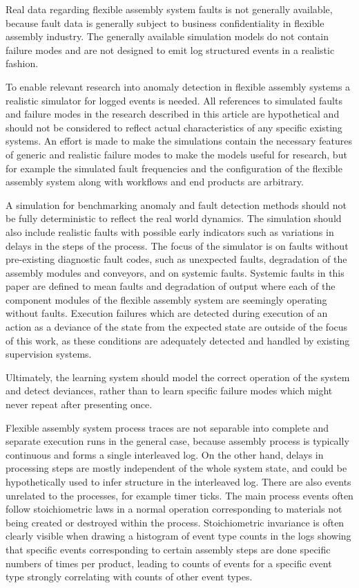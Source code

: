 \documentclass[procedia]{easychair}
\begin{document}
Real data regarding flexible assembly system faults is
not generally available, because fault data is generally subject to business confidentiality in flexible assembly industry.
The generally available simulation models do not contain failure modes and are not designed to emit
log structured events in a realistic fashion.

To enable relevant research into anomaly detection in flexible assembly systems a realistic simulator for logged events is needed.
All references to simulated faults and failure modes in the research described in this article are hypothetical and should not be considered to
reflect actual characteristics of any specific existing systems. An effort is made to make the simulations contain the necessary features of
generic and realistic failure modes to make the models useful for research, but for example the simulated fault frequencies and the configuration
of the flexible assembly system along with workflows and end products are arbitrary.

A simulation for benchmarking anomaly and fault detection methods should not be fully deterministic to reflect the real world dynamics. The simulation should also
include realistic faults with possible early indicators such as variations in delays in the steps of the process. The focus of the simulator is on faults without pre-existing
diagnostic fault codes, such as unexpected faults, degradation of the assembly modules and conveyors, and on systemic faults. Systemic faults in this paper
are defined to mean faults and degradation of output where each of the component modules of the flexible assembly system are seemingly operating without faults. Execution failures
which are detected during execution of an action as a deviance of the state from the expected state are outside of the focus of this work, as these conditions are adequately detected and handled
by existing supervision systems.

Ultimately, the learning system should model the correct operation of the system and detect deviances, rather than to learn specific failure modes which might never repeat after presenting once.

Flexible assembly system process traces are not separable into complete and separate execution runs in the general case, because assembly process is typically continuous and
forms a single interleaved log.
On the other hand, delays in processing steps are mostly independent of the whole system state, and could be hypothetically used to infer structure in the interleaved log.
There are also events unrelated to the processes, for example timer ticks. The main process events often follow stoichiometric laws in a normal operation corresponding to materials
not being created or destroyed within the process. Stoichiometric invariance is often clearly visible when drawing a histogram of event type counts in the logs showing that specific events corresponding to certain
assembly steps are done specific numbers of times per product, leading to counts of events for a specific event type strongly correlating with counts of other event types.
\end{document}
